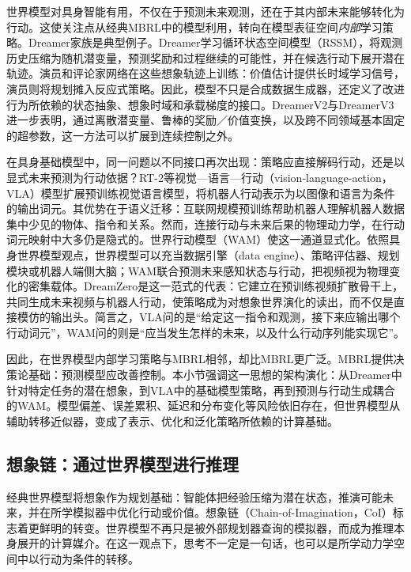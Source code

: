 世界模型对具身智能有用，不仅在于预测未来观测，还在于其内部未来能够转化为行动。这使关注点从经典MBRL中的模型利用，转向在模型表征空间\emph{内部}学习策略。Dreamer家族是典型例子。Dreamer学习循环状态空间模型（RSSM），将观测历史压缩为随机潜变量，预测奖励和过程继续的可能性，并在候选行动下展开潜在轨迹\citep{hafner2019dreamer,hafner2020dreamerv2,hafner2023dreamerv3}。演员和评论家网络在这些想象轨迹上训练：价值估计提供长时域学习信号，演员则将规划摊入反应式策略。因此，模型不只是合成数据生成器，还定义了改进行为所依赖的状态抽象、想象时域和承载梯度的接口。DreamerV2与DreamerV3进一步表明，通过离散潜变量、鲁棒的奖励／价值变换，以及跨不同领域基本固定的超参数，这一方法可以扩展到连续控制之外。

在具身基础模型中，同一问题以不同接口再次出现：策略应直接解码行动，还是以显式未来预测为行动依据？RT-2等视觉—语言—行动（vision-language-action，VLA）模型\citep{zitkovich2023rt}扩展预训练视觉语言模型，将机器人行动表示为以图像和语言为条件的输出词元。其优势在于语义迁移：互联网规模预训练帮助机器人理解机器人数据集中少见的物体、指令和关系。然而，连接行动与未来后果的物理动力学，在行动词元映射中大多仍是隐式的。世界行动模型（WAM）使这一通道显式化。依照具身世界模型观点，世界模型可以充当数据引擎（data engine）、策略评估器、规划模块或机器人端侧大脑\citep{shang2026survey}；WAM联合预测未来感知状态与行动，把视频视为物理变化的密集载体。DreamZero是这一范式的代表：它建立在预训练视频扩散骨干上，共同生成未来视频与机器人行动，使策略成为对想象世界演化的读出，而不仅是直接模仿的输出头\citep{ye2026dreamzero}。简言之，VLA问的是“给定这一指令和观测，接下来应输出哪个行动词元”，WAM问的则是“应当发生怎样的未来，以及什么行动序列能实现它”。

因此，在世界模型内部学习策略与MBRL相邻，却比MBRL更广泛。MBRL提供决策论基础：预测模型应改善控制。本小节强调这一思想的架构演化：从Dreamer中针对特定任务的潜在想象，到VLA中的基础模型策略，再到预测与行动生成耦合的WAM。模型偏差、误差累积、延迟和分布变化等风险依旧存在，但世界模型从辅助转移近似器，变成了表示、优化和泛化策略所依赖的计算基础。

\subsection{想象链：通过世界模型进行推理}
经典世界模型将想象作为规划基础：智能体把经验压缩为潜在状态，推演可能未来，并在所学模拟器中优化行动或价值\citep{ha2018worldmodels,hafner2019dreamer,Schrittwieser2020}。想象链（Chain-of-Imagination，CoI）标志着更鲜明的转变。世界模型不再只是被外部规划器查询的模拟器，而成为推理本身展开的计算媒介。在这一观点下，思考不一定是一句话，也可以是所学动力学空间中以行动为条件的转移。

